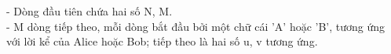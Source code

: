 - Dòng đầu tiên chứa hai số N, M.   
\\   - M dòng tiếp theo, mỗi dòng bắt đầu bởi một chữ cái 'A' hoặc 'B', tương ứng với lời kể của Alice hoặc Bob; tiếp theo là hai số u, v tương ứng.